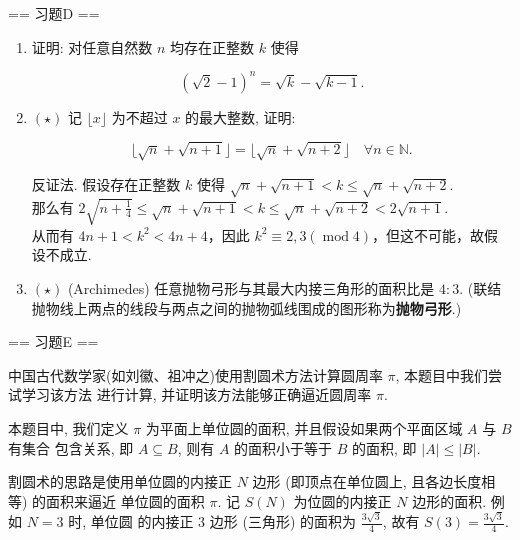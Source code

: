 == 习题D ==

\begin{enumerate}
    \item[1.]证明: 对任意自然数 $n$ 均存在正整数 $k$ 使得

    \[(\sqrt{2} -1)^{n} = \sqrt{k} -\sqrt{k - 1}.\]

    \item[2.]$(\star)$ 记 $\lfloor x\rfloor$ 为不超过 $x$ 的最大整数, 证明:

    \[\lfloor \sqrt{n} +\sqrt{n + 1}\rfloor = \lfloor \sqrt{n} +\sqrt{n + 2}\rfloor 
    \quad \forall n\in \mathbb{N}.\]

    \begin{solution}
        反证法. 假设存在正整数 $k$ 使得 $\displaystyle \sqrt{n}+\sqrt{n+1}<k\leq \sqrt{n}+\sqrt{n+2}$.\\
        那么有 $\displaystyle 2\sqrt{n+\frac{1}{4}}\leq\sqrt{n}+\sqrt{n+1}<k\leq\sqrt{n}+\sqrt{n+2}<2\sqrt{n+1}$.\\
        从而有 $4n+1<k^2<4n+4$，因此 $k^2\equiv 2,3 \left(\operatorname{mod} 4\right)$，但这不可能，故假设不成立. 
    \end{solution}

    \item[3.]$(\star)$ (Archimedes) 任意抛物弓形与其最大内接三角形的面积比是 $4:3$. 
    (联结抛物线上两点的线段与两点之间的抛物弧线围成的图形称为\textbf{抛物弓形}.)
\end{enumerate}

== 习题E ==

中国古代数学家(如刘徽、祖冲之)使用割圆术方法计算圆周率 $\pi$, 本题目中我们尝试学习该方法
进行计算, 并证明该方法能够正确逼近圆周率 $\pi$.

本题目中, 我们定义 $\pi$ 为平面上单位圆的面积, 并且假设如果两个平面区域 $A$ 与 $B$ 有集合
包含关系, 即 $A \subseteq B$, 则有 $A$ 的面积小于等于 $B$ 的面积, 即 $|A| \leq |B|$.

割圆术的思路是使用单位圆的内接正 $N$ 边形 (即顶点在单位圆上, 且各边长度相等) 的面积来逼近
单位圆的面积 $\pi$. 记 $S(N)$ 为位圆的内接正 $N$ 边形的面积. 例如 $N = 3$ 时, 单位圆
的内接正 3 边形 (三角形) 的面积为 $\displaystyle\frac{3\sqrt{3}}{4}$, 故有 $S(3) = \displaystyle\frac{3\sqrt{3}}{4}$.

